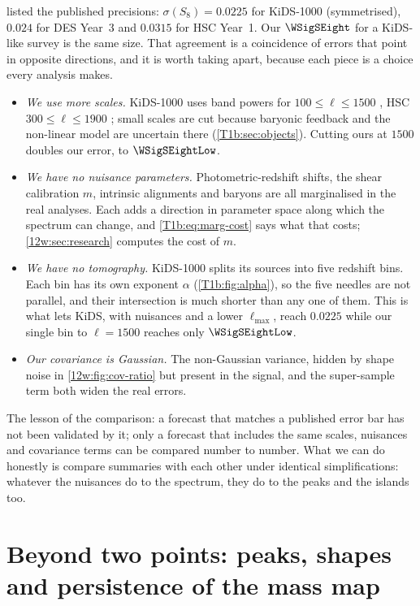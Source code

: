  listed the published precisions: $\sigma(S_8)=0.0225$ for KiDS-1000 (symmetrised),
$0.024$ for DES Year~3 and $0.0315$ for HSC Year~1. Our $\WSigSEight$ for a KiDS-like survey is the same size. That
agreement is a coincidence of errors that point in opposite directions, and it is worth taking apart, because each
piece is a choice every analysis makes.
\begin{itemize}[itemsep=1pt,leftmargin=1.2em]
  \item \emph{We use more scales.} KiDS-1000 uses band powers for $100\le\ell\le1500$ \cite{Asgari2021KiDS}, HSC
        $300\le\ell\le1900$ \cite{Hikage2019HSC}; small scales are cut because baryonic feedback and the non-linear
        model are uncertain there (\cref{T1b:sec:objects}). Cutting ours at $1500$ doubles our error, to
        $\WSigSEightLow$.
  \item \emph{We have no nuisance parameters.} Photometric-redshift shifts, the shear calibration $m$, intrinsic
        alignments and baryons are all marginalised in the real analyses. Each adds a direction in parameter space along
        which the spectrum can change, and \eqref{T1b:eq:marg-cost} says what that costs; \cref{12w:sec:research}
        computes the cost of $m$.
  \item \emph{We have no tomography.} KiDS-1000 splits its sources into five redshift bins. Each bin has its own
        exponent $\alpha$ (\cref{T1b:fig:alpha}), so the five needles are not parallel, and their intersection is much
        shorter than any one of them. This is what lets KiDS, with nuisances and a lower $\ell_{\max}$, reach
        $0.0225$ while our single bin to $\ell=1500$ reaches only $\WSigSEightLow$.
  \item \emph{Our covariance is Gaussian.} The non-Gaussian variance, hidden by shape noise in
        \cref{12w:fig:cov-ratio} but present in the signal, and the super-sample term both widen the real errors.
\end{itemize}
The lesson of the comparison: a forecast that matches a published error bar has not been validated by it; only a
forecast that includes the same scales, nuisances and covariance terms can be compared number to number. What we can
do honestly is compare summaries with each other under identical simplifications: whatever the nuisances do to
the spectrum, they do to the peaks and the islands too.
\section{Beyond two points: peaks, shapes and persistence of the mass map}
\label{12w:sec:beyond}

